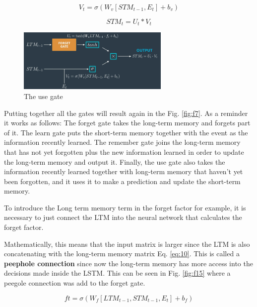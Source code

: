 \documentclass{article}
\begin{document}
\begin{equation}
V_t = \sigma(W_v[STM_{t-1}, E_t] + b_v)
\label{eq:8}
\end{equation}

\begin{equation}
STM_t = U_t * V_t
\label{eq:9}
\end{equation}


\begin{figure}[ht]
    \centering
    \includegraphics[width=0.65\textwidth,height=0.65\textheight,keepaspectratio]{images/use_gate.png}
    \captionsetup{justification=centering}
    \caption{The use gate}
    \label{fig:f14}
\end{figure}

Putting together all the gates will result again in the Fig. \ref{fig:f7}. As a reminder it works as follows: The forget gate takes the long-term memory and forgets part of it. The learn gate puts the short-term memory together with the event as the information recently learned. The remember gate joins the long-term memory that has not yet forgotten plus the new information learned in order to update the long-term memory and output it. Finally, the use gate also takes the information recently learned together with long-term memory that haven't yet been forgotten, and it uses it to make a prediction and update the short-term memory.

To introduce the Long term memory term in the forget factor for example, it is necessary to just connect the LTM into the neural network that calculates the forget factor.

Mathematically, this means that the input matrix is larger since the LTM is also concatenating with the long-term memory matrix Eq. \eqref{eq:10}. This is called a\textbf{ peephole connection} since now the long-term memory has more access into the decisions made inside the LSTM. This can be seen in Fig. \ref{fig:f15} where a peegole connection was add to the forget gate.

\begin{equation}
ft = \sigma(W_f[LTM_{t-1},STM_{t-1}, E_t] + b_f)
\label{eq:10}
\end{equation}
\end{document}
